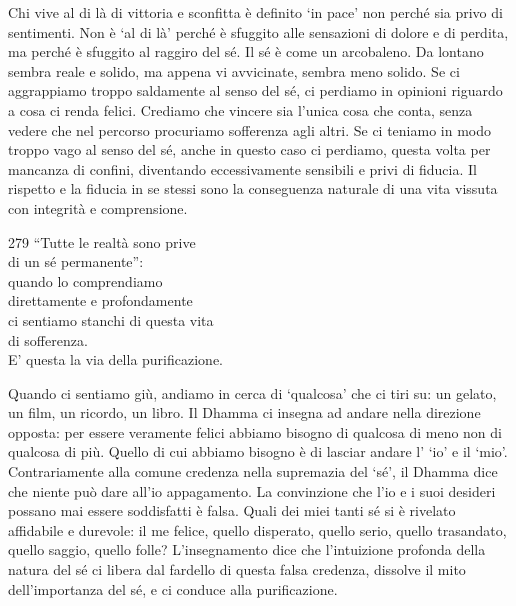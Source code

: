 \begin{dhpRefl}
Chi vive al di l\`{a} di vittoria e sconfitta \`{e} definito `in pace' non perch\'{e} sia privo di sentimenti. Non \`{e} `al di l\`{a}' perch\'{e} \`{e} sfuggito alle sensazioni di dolore e di perdita, ma perch\'{e} \`{e} sfuggito al raggiro del s\'{e}. Il s\'{e} \`{e} come un arcobaleno. Da lontano sembra reale e solido, ma appena vi avvicinate, sembra meno solido. Se ci aggrappiamo troppo saldamente al senso del s\'{e}, ci perdiamo in opinioni riguardo a cosa ci renda felici. Crediamo che vincere sia l'unica cosa che conta, senza vedere che nel percorso procuriamo sofferenza agli altri. Se ci teniamo in modo troppo vago al senso del s\'{e}, anche in questo caso ci perdiamo, questa volta per mancanza di confini, diventando eccessivamente sensibili e privi di fiducia. Il rispetto e la fiducia in se stessi sono la conseguenza naturale di una vita vissuta con integrit\`{a} e comprensione.   
\end{dhpRefl}


\begin{dhpVerse}{279}
\label{dhp-279}
``Tutte le realt\`{a} sono prive \\
di un s\'{e} permanente'':\\
quando lo comprendiamo\\
direttamente e profondamente\\
ci sentiamo stanchi di questa vita\\
di sofferenza.\\
E' questa la via della purificazione.
\end{dhpVerse}

\begin{dhpRefl}
Quando ci sentiamo giù, andiamo in cerca di `qualcosa' che ci tiri su: un gelato, un film, un ricordo, un libro. Il Dhamma ci insegna ad andare nella direzione opposta: per essere veramente felici abbiamo bisogno di qualcosa di meno non di qualcosa di più. Quello di cui abbiamo bisogno \`{e} di lasciar andare l' `io' e il `mio'. Contrariamente alla comune credenza nella supremazia del `s\'{e}', il Dhamma dice che niente pu\`{o} dare all'io appagamento. La convinzione che l'io e i suoi desideri possano mai essere soddisfatti \`{e} falsa. Quali dei miei tanti s\'{e} si \`{e} rivelato affidabile e durevole: il me felice, quello disperato, quello serio, quello trasandato, quello saggio, quello folle? L'insegnamento dice che l'intuizione profonda della natura del s\'{e} ci libera dal fardello di questa falsa credenza, dissolve il mito dell'importanza del s\'{e}, e ci conduce alla purificazione.
\end{dhpRefl}

